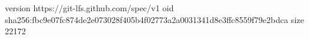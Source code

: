 version https://git-lfs.github.com/spec/v1
oid sha256:fbc9e07fc874de2e073028f405b4f02773a2a0031341d8e3ffc8559f79e2bdca
size 22172
